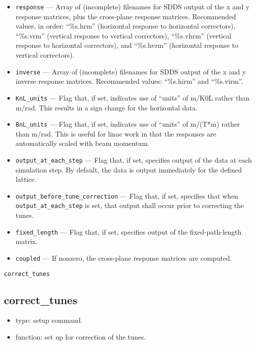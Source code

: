 \documentclass[11pt]{article}
\begin{document}
\begin{itemize}
\item \verb|response| --- Array of (incomplete) filenames for SDDS output of the x and y response
matrices, plus the cross-plane response matrices.  Recommended values, in order: ``\%s.hrm'' (horizontal
response to horizontal correctors), ``\%s.vrm'' (vertical response to vertical correctors),
``\%s.vhrm'' (vertical response to horizontal correctors), and 
``\%s.hvrm'' (horizontal response to vertical correctors).
\item \verb|inverse| --- Array of (incomplete) filenames for SDDS output of the x and y 
inverse response matrices. Recommended values: ``\%s.hirm'' and ``\%s.virm''.
\item \verb|KnL_units| --- Flag that, if set, indicates use of ``units'' of m/K0L rather than
m/rad.  This results in a sign change for the horizontal data.
\item \verb|BnL_units| --- Flag that, if set, indicates use of ``units'' of m/(T*m) rather than
m/rad.  This is useful for linac work in that the responses are automatically scaled with 
beam momentum.
\item \verb|output_at_each_step| --- Flag that, if set, specifies output of the data at
each simulation step.  By default, the data is output immediately for the defined lattice.
\item \verb|output_before_tune_correction| --- Flag that, if set, specifies that when 
\verb|output_at_each_step| is set, that output shall occur prior to correcting the tunes.
\item \verb|fixed_length| --- Flag that, if set, specifies output of the fixed-path-length
matrix.
\item \verb|coupled| --- If nonzero, the cross-plane response matrices are computed.
\end{itemize}

\begin{latexonly}
\newpage
\begin{center}{\Large\verb|correct_tunes|}\end{center}
\end{latexonly}
\subsection{correct\_tunes \label{subsec:correcttunes}}

\begin{itemize}
\item type: setup command.
\item function: set up for correction of the tunes.
\end{itemize}
\end{document}
